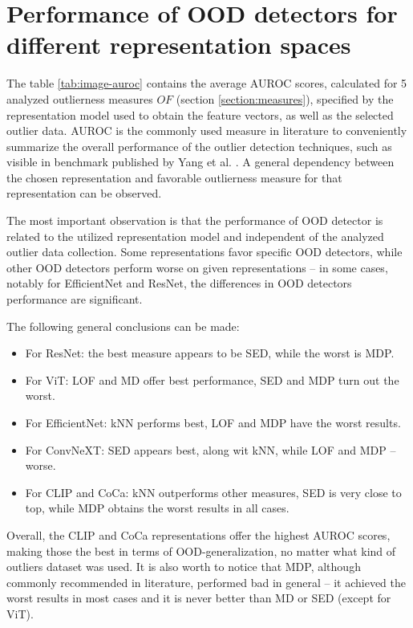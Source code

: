 \section{Performance of OOD detectors for different representation spaces}
\label{section:real-overall}

The table \ref{tab:image-auroc} contains the average AUROC scores, calculated for 5 analyzed outlierness measures $OF$ (section \ref{section:measures}), specified by the representation model used to obtain the feature vectors, as well as the selected outlier data. AUROC is the commonly used measure in literature to conveniently summarize the overall performance of the outlier detection techniques, such as visible in benchmark published by Yang et al. \cite{Yang-2022}. A general dependency between the chosen representation and favorable outlierness measure for that representation can be observed.

The most important observation is that the performance of OOD detector is related to the utilized representation model and independent of the analyzed outlier data collection. Some representations favor specific OOD detectors, while other OOD detectors perform worse on given representations – in some cases, notably for EfficientNet and ResNet, the differences in OOD detectors performance are significant.

The following general conclusions can be made:
\vspace{-0.5\baselineskip}
\begin{itemize}
    \item For ResNet: the best measure appears to be SED, while the worst is MDP.
    \item For ViT: LOF and MD offer best performance, SED and MDP turn out the worst.
    \item For EfficientNet: kNN performs best, LOF and MDP have the worst results.
    \item For ConvNeXT: SED appears best, along wit kNN, while LOF and MDP – worse.
    \item For CLIP and CoCa: kNN outperforms other measures, SED is very close to top, while MDP obtains the worst results in all cases.
\end{itemize}

Overall, the CLIP and CoCa representations offer the highest AUROC scores, making those the best in terms of OOD-generalization, no matter what kind of outliers dataset was used. It is also worth to notice that MDP, although commonly recommended in literature, performed bad in general – it achieved the worst results in most cases and it is never better than MD or SED (except for ViT).

